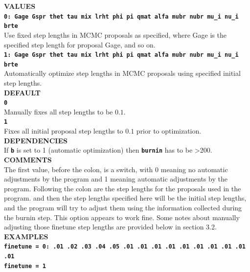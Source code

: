 \documentclass[a4paper]{book}
\numberwithin{equation}{section} \renewcommand{\baselinestretch}{0.55}
\begin{document}
\textbf{VALUES} \vspace{5pt}\\
\textbf{\texttt{0: Gage Gspr thet tau mix lrht phi pi qmat alfa mubr nubr mu\_i nu\_i brte}}\\
Use fixed step lengths in MCMC proposals as specified, where Gage is the specified step length for proposal Gage, and so on. \vspace{5pt}\\
\textbf{\texttt{1: Gage Gspr thet tau mix lrht phi pi qmat alfa mubr nubr mu\_i nu\_i brte}}\\
Automatically optimize step lengths in MCMC proposals using specified initial step lengths. \vspace{5pt}\\
\textbf{DEFAULT} \vspace{5pt}\\
\textbf{\texttt{0}} \\
Manually fixes all step lengths to be $0.1$.\\
\textbf{\texttt{1}} \\
Fixes all initial proposal step lengths to $0.1$ prior to optimization.\\ 
\textbf{DEPENDENCIES} \vspace{5pt}\\
If \textbf{\texttt{b}} is set to 1 (automatic optimization) then \textbf{\texttt{burnin}} has to be >200. \vspace{5pt}\\
\textbf{COMMENTS} \vspace{5pt}\\
The first value, before the colon, is a switch, with 0 meaning no
automatic adjustments by the program and 1 meaning automatic
adjustments by the program.  Following the colon are the step lengths
for the proposals used in the program.  and then the step lengths
specified here will be the initial step lengths, and the program will
try to adjust them using the information collected during the burnin
step.  This option appears to work fine.  Some notes about manually
adjusting those finetune step lengths are provided below in section
3.2. \vspace{5pt}\\
\textbf{EXAMPLES} \vspace{5pt}\\
\textbf{\texttt{finetune = 0: .01 .02 .03 .04 .05 .01 .01 .01 .01 .01 .01 .01 .01 .01 .01}} \vspace{5pt}\\
\textbf{\texttt{finetune = 1}}\vspace{10pt}\\
\end{document}
